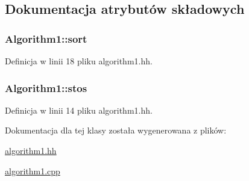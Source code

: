 \subsection{Dokumentacja atrybutów składowych}
\hypertarget{class_algorithm1_a1c9da737fa3cf2373357f558496f09b4}{
\subsubsection[{sort}]{ Algorithm1\-::sort\hspace{0.3cm}{\ttfamily [private]}}}\label{class_algorithm1_a1c9da737fa3cf2373357f558496f09b4}


Definicja w linii 18 pliku algorithm1.\-hh.

\hypertarget{class_algorithm1_a3fb7f66d1e4aae77a49c6f7c241f47c9}{
\subsubsection[{stos}]{ Algorithm1\-::stos\hspace{0.3cm}{\ttfamily [private]}}}\label{class_algorithm1_a3fb7f66d1e4aae77a49c6f7c241f47c9}


Definicja w linii 14 pliku algorithm1.\-hh.



Dokumentacja dla tej klasy została wygenerowana z plików\-:\begin{DoxyCompactItemize}
\item 
\hyperlink{algorithm1_8hh}{algorithm1.\-hh}\item 
\hyperlink{algorithm1_8cpp}{algorithm1.\-cpp}\end{DoxyCompactItemize}
